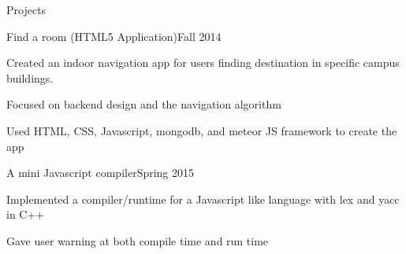 \documentclass{resume} %
\begin{document}

\begin{rSection}{Projects}

\begin{rSubsection}{Find a room (HTML5 Application)}{Fall 2014}{}{}
\item Created an indoor navigation app for users finding destination in specific campus buildings.
\item Focused on backend design and the navigation algorithm
\item Used HTML, CSS, Javascript, mongodb, and meteor JS framework to create the app
\end{rSubsection}

\begin{rSubsection}{A mini Javascript compiler}{Spring 2015}{}{}
\item Implemented a compiler/runtime for a Javascript like language with lex and yacc in C++
\item Gave user warning at both compile time and run time
\end{rSubsection}










\end{rSection}
\end{document}
